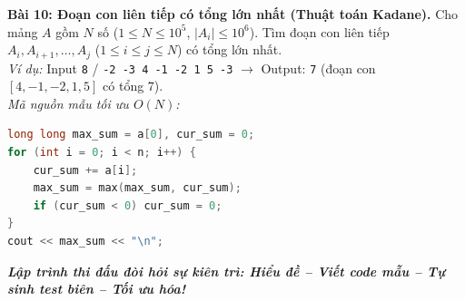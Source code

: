 \documentclass[11pt,a4paper]{article}
\begin{document}
\vspace{0.15cm}
\noindent
\textbf{\color{AsianBlue}Bài 10: Đoạn con liên tiếp có tổng lớn nhất (Thuật toán Kadane).} Cho mảng $A$ gồm $N$ số ($1 \le N \le 10^5$, $|A_i| \le 10^6$). Tìm đoạn con liên tiếp $A_i, A_{i+1}, \dots, A_j$ ($1 \le i \le j \le N$) có tổng lớn nhất.\\
\textit{Ví dụ:} Input \texttt{8} / \texttt{-2 -3 4 -1 -2 1 5 -3} $\to$ Output: \texttt{7} (đoạn con $[4, -1, -2, 1, 5]$ có tổng $7$).\\
\textit{Mã nguồn mẫu tối ưu $O(N)$:}
\begin{lstlisting}[language=C++]
long long max_sum = a[0], cur_sum = 0;
for (int i = 0; i < n; i++) {
    cur_sum += a[i];
    max_sum = max(max_sum, cur_sum);
    if (cur_sum < 0) cur_sum = 0;
}
cout << max_sum << "\n";
\end{lstlisting}

\vspace{0.2cm}
\begin{center}
    \textit{\color{AsianDarkBlue}\textbf{Lập trình thi đấu đòi hỏi sự kiên trì: Hiểu đề -- Viết code mẫu -- Tự sinh test biên -- Tối ưu hóa!}}
\end{center}
\end{document}

